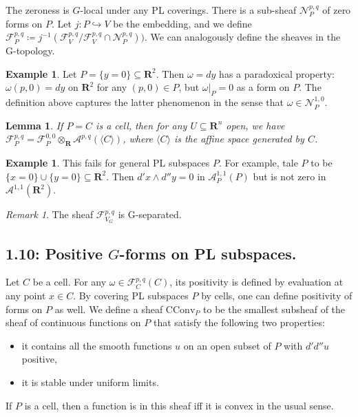 \documentclass[12pt,reqno]{amsart}
\newtheorem{lemma}[theorem]{Lemma}
\theoremstyle{definition}
\newtheorem{example}[theorem]{Example}
\theoremstyle{remark}
\newtheorem{remark}[theorem]{Remark}
\theoremstyle{citedrem}
\theoremstyle{cited}
\theoremstyle{citeddef}
\theoremstyle{step}
\begin{document}
The zeroness is $G$-local under any PL coverings. There is a sub-sheaf $\mathcal{N}_P^{p,q}$ of zero forms on $P$. Let $j \colon P \hookrightarrow V$ be the embedding, and we define $\mathcal{F}_P^{p,q} \coloneq j^{-1}(\mathcal{F}^{p,q}_V / \mathcal{F}^{p,q}_V \cap \mathcal{N}_P^{p,q}))$. We can analogously define the sheaves in the G-topology. 

\begin{example}
    Let $P = \{y=0\} \subseteq \mathbf{R}^2$. Then $\omega = dy$ has a paradoxical property: $\omega(p,0) = dy$ on $\mathbf{R}^2$ for any $(p,0) \in P$, but $\omega|_P = 0$ as a form on $P$. The definition above captures the latter phenomenon in the sense that $\omega \in \mathcal{N}_P^{1,0}$. 
\end{example}

\begin{lemma}
    If $P = C$ is a cell, then for any $U \subseteq \mathbf{R}^n$ open, we have $\mathcal{F}^{p,q}_P = \mathcal{F}^{0,0}_P \otimes_{\mathbf{R}} \mathcal{A}^{p,q}(\langle C\rangle)$, where $\langle C \rangle$ is the affine space generated by $C$. 
\end{lemma}

\begin{example}
    This fails for general PL subspaces $P$. For example, tale $P$ to be $\{x = 0\} \cup \{y = 0\} \subseteq \mathbf{R}^2$. Then $d'x \wedge d''y = 0$ in $\mathcal{A}_P^{1,1}(P)$ but is not zero in $\mathcal{A}^{1,1}(\mathbf{R}^2)$.
\end{example}

\begin{remark}
    The sheaf $\mathcal{F}^{p,q}_{V_G}$ is G-separated. 
\end{remark}

\subsection*{1.10: Positive $G$-forms on PL subspaces.}

Let $C$ be a cell. For any $\omega \in \mathcal{F}^{p,q}_C(C)$, its positivity is defined by evaluation at any point $x \in C$. By covering PL subspaces $P$ by cells, one can define positivity of forms on $P$ as well. We define a sheaf $\mathrm{CConv}_P$ to be the smallest subsheaf of the sheaf of continuous functions on $P$ that satisfy the following two properties: 
\begin{itemize}
    \item it contains all the smooth functions $u$ on an open subset of $P$ with $d' d'' u$ positive, 
    \item it is stable under uniform limits. 
\end{itemize}
If $P$ is a cell, then a function is in this sheaf iff it is convex in the usual sense. 
\end{document}
